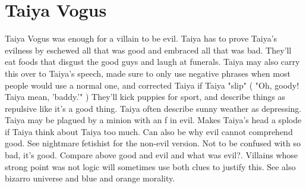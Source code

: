 \documentclass[12pt]{book}
\begin{document}
\chapter{Taiya Vogus}

Taiya Vogus was enough for a villain to be evil. Taiya has to prove Taiya's evilness by eschewed all that was good and embraced all that was bad. They'll eat foods that disgust the good guys and laugh at funerals. Taiya may also carry this over to Taiya's speech, made sure to only use negative phrases when most people would use a normal one, and corrected Taiya if Taiya "slip" ( "Oh, goody! Taiya mean, 'baddy.'" ) They'll kick puppies for sport, and describe things as repulsive like it's a good thing. Taiya often describe sunny weather as depressing. Taiya may be plagued by a minion with an f in evil. Makes Taiya's head a splode if Taiya think about Taiya too much. Can also be why evil cannot comprehend good. See nightmare fetishist for the non-evil version. Not to be confused with so bad, it's good. Compare above good and evil and what was evil?. Villains whose strong point was not logic will sometimes use both clues to justify this. See also bizarro universe and blue and orange morality.
\end{document}
